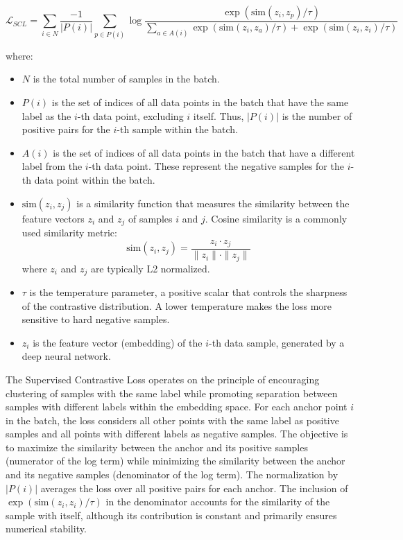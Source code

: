 $$
\mathcal{L}_{SCL} = \sum_{i \in N} \frac{-1}{|P(i)|} \sum_{p \in P(i)} \log \frac{\exp(\text{sim}(z_i, z_p) / \tau)}{\sum_{a \in A(i)} \exp(\text{sim}(z_i, z_a) / \tau) + \exp(\text{sim}(z_i, z_i) / \tau)}
$$

where:
\begin{itemize}
    \item $N$ is the total number of samples in the batch.
    \item $P(i)$ is the set of indices of all data points in the batch that have the same label as the $i$-th data point, excluding $i$ itself. Thus, $|P(i)|$ is the number of positive pairs for the $i$-th sample within the batch.
    \item $A(i)$ is the set of indices of all data points in the batch that have a different label from the $i$-th data point. These represent the negative samples for the $i$-th data point within the batch.
    \item $\text{sim}(z_i, z_j)$ is a similarity function that measures the similarity between the feature vectors $z_i$ and $z_j$ of samples $i$ and $j$. Cosine similarity is a commonly used similarity metric:
    $$
    \text{sim}(z_i, z_j) = \frac{z_i \cdot z_j}{\|z_i\| \cdot \|z_j\|}
    $$
    where $z_i$ and $z_j$ are typically L2 normalized.
    \item $\tau$ is the temperature parameter, a positive scalar that controls the sharpness of the contrastive distribution. A lower temperature makes the loss more sensitive to hard negative samples.
    \item $z_i$ is the feature vector (embedding) of the $i$-th data sample, generated by a deep neural network.
\end{itemize}

The Supervised Contrastive Loss operates on the principle of encouraging clustering of samples with the same label while promoting separation between samples with different labels within the embedding space. For each anchor point $i$ in the batch, the loss considers all other points with the same label as positive samples and all points with different labels as negative samples. The objective is to maximize the similarity between the anchor and its positive samples (numerator of the log term) while minimizing the similarity between the anchor and its negative samples (denominator of the log term). The normalization by $|P(i)|$ averages the loss over all positive pairs for each anchor. The inclusion of $\exp(\text{sim}(z_i, z_i) / \tau)$ in the denominator accounts for the similarity of the sample with itself, although its contribution is constant and primarily ensures numerical stability.


